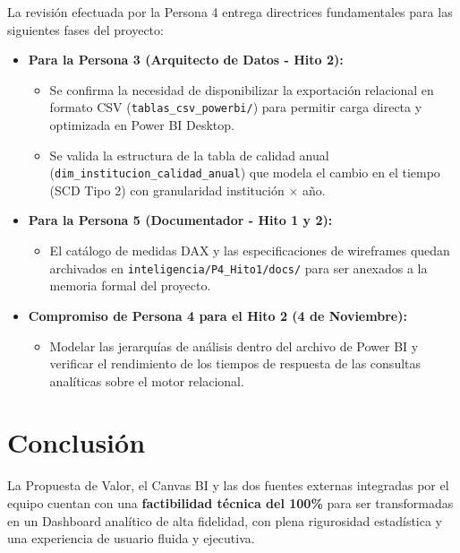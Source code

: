\documentclass[11pt,a4paper]{article}
\begin{document}
La revisión efectuada por la Persona 4 entrega directrices fundamentales para las siguientes fases del proyecto:
\begin{itemize}
    \item \textbf{Para la Persona 3 (Arquitecto de Datos - Hito 2):}
    \begin{itemize}
        \item Se confirma la necesidad de disponibilizar la exportación relacional en formato CSV (\texttt{tablas\_csv\_powerbi/}) para permitir carga directa y optimizada en Power BI Desktop.
        \item Se valida la estructura de la tabla de calidad anual (\texttt{dim\_institucion\_calidad\_anual}) que modela el cambio en el tiempo (SCD Tipo 2) con granularidad institución $\times$ año.
    \end{itemize}
    \item \textbf{Para la Persona 5 (Documentador - Hito 1 y 2):}
    \begin{itemize}
        \item El catálogo de medidas DAX y las especificaciones de wireframes quedan archivados en \texttt{inteligencia/P4\_Hito1/docs/} para ser anexados a la memoria formal del proyecto.
    \end{itemize}
    \item \textbf{Compromiso de Persona 4 para el Hito 2 (4 de Noviembre):}
    \begin{itemize}
        \item Modelar las jerarquías de análisis dentro del archivo de Power BI y verificar el rendimiento de los tiempos de respuesta de las consultas analíticas sobre el motor relacional.
    \end{itemize}
\end{itemize}

\section{Conclusión}
La Propuesta de Valor, el Canvas BI y las dos fuentes externas integradas por el equipo cuentan con una \textbf{factibilidad técnica del 100\%} para ser transformadas en un Dashboard analítico de alta fidelidad, con plena rigurosidad estadística y una experiencia de usuario fluida y ejecutiva.
\end{document}
